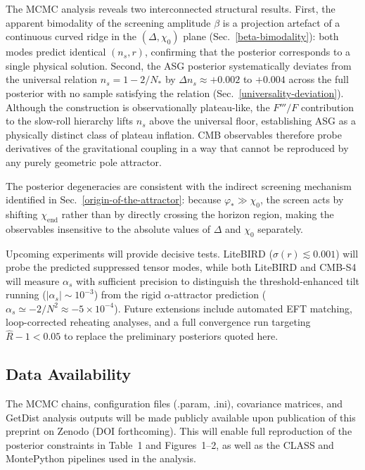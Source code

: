 \documentclass[
]{article}
\begin{document}
The MCMC analysis reveals two interconnected structural results.
First, the apparent bimodality of the screening amplitude \(\beta\)
is a projection artefact of a continuous curved ridge in the
\((\Delta,\chi_{0})\) plane (Sec.~\ref{beta-bimodality}): both modes
predict identical \((n_{s},r)\), confirming that the posterior
corresponds to a single physical solution.
Second, the ASG posterior systematically deviates from the universal
relation \(n_{s} = 1 - 2/N_{*}\) by \(\Delta n_{s} \approx +0.002\)
to \(+0.004\) across the full posterior with no sample satisfying the
relation (Sec.~\ref{universality-deviation}). Although the construction
is observationally plateau-like, the \(F'''/F\) contribution to the
slow-roll hierarchy lifts \(n_{s}\) above the universal floor,
establishing ASG as a physically distinct class of plateau inflation.
CMB observables therefore probe derivatives of the gravitational
coupling in a way that cannot be reproduced by any purely geometric
pole attractor.

The posterior degeneracies are consistent with the indirect screening
mechanism identified in Sec.~\ref{origin-of-the-attractor}: because
\(\varphi_{*} \gg \chi_{0}\), the screen acts by shifting
\(\chi_{\mathrm{end}}\) rather than by directly crossing the horizon
region, making the observables insensitive to the absolute values of
\(\Delta\) and \(\chi_{0}\) separately.

Upcoming experiments will provide decisive tests. LiteBIRD
(\(\sigma(r) \lesssim 0.001\)) will probe the predicted suppressed
tensor modes, while both LiteBIRD and CMB-S4 will measure
\(\alpha_{s}\) with sufficient precision to distinguish the
threshold-enhanced tilt running (\(|\alpha_{s}| \sim 10^{-3}\)) from
the rigid \(\alpha\)-attractor prediction
(\(\alpha_{s} \simeq -2/N^{2} \approx -5 \times 10^{-4}\)).
Future extensions include automated EFT matching, loop-corrected
reheating analyses, and a full convergence run targeting
\(\hat{R}-1 < 0.05\) to replace the preliminary posteriors quoted here.

\subsection{Data Availability}\label{data-availability}

The MCMC chains, configuration files (.param, .ini), covariance
matrices, and GetDist analysis outputs will be made publicly available
upon publication of this preprint on Zenodo (DOI forthcoming). This will
enable full reproduction of the posterior constraints in Table~1 and
Figures~1--2, as well as the CLASS and MontePython pipelines used in the
analysis.
\end{document}
